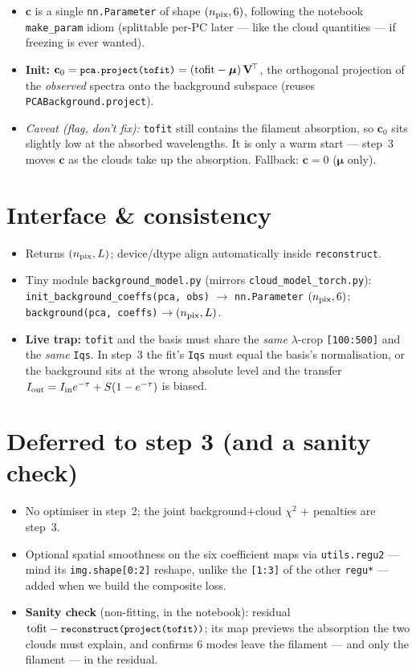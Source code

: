 \documentclass[10pt,a4paper]{article}
\newcommand{\co}[1]{{\small\texttt{#1}}}
\begin{document}
\begin{itemize}
\item $\mathbf c$ is a single \co{nn.Parameter} of shape $(n_{\rm pix},6)$, following the notebook \co{make\_param} idiom (splittable per-PC later --- like the cloud quantities --- if freezing is ever wanted).
\item \textbf{Init:} $\mathbf c_0=\co{pca.project(tofit)}=(\text{tofit}-\boldsymbol\mu)\,\mathbf V^{\!\top}$, the orthogonal projection of the \emph{observed} spectra onto the background subspace (reuses \co{PCABackground.project}).
\item \emph{Caveat (flag, don't fix):} \co{tofit} still contains the filament absorption, so $\mathbf c_0$ sits slightly low at the absorbed wavelengths. It is only a warm start --- step~3 moves $\mathbf c$ as the clouds take up the absorption. Fallback: $\mathbf c=0$ ($\boldsymbol\mu$ only).
\end{itemize}

\section{Interface \& consistency}

\begin{itemize}
\item Returns $(n_{\rm pix},L)$; device/dtype align automatically inside \co{reconstruct}.
\item Tiny module \co{background\_model.py} (mirrors \co{cloud\_model\_torch.py}): \co{init\_background\_coeffs(pca, obs)} $\rightarrow$ \co{nn.Parameter} $(n_{\rm pix},6)$; \co{background(pca, coeffs)} $\rightarrow (n_{\rm pix},L)$.
\item \textbf{Live trap:} \co{tofit} and the basis must share the \emph{same} $\lambda$-crop \co{[100:500]} and the \emph{same} \co{Iqs}. In step~3 the fit's \co{Iqs} must equal the basis's normalisation, or the background sits at the wrong absolute level and the transfer $I_{\rm out}=I_{\rm in}e^{-\tau}+S(1-e^{-\tau})$ is biased.
\end{itemize}

\section{Deferred to step 3 (and a sanity check)}

\begin{itemize}
\item No optimiser in step~2; the joint background+cloud $\chi^2$ + penalties are step~3.
\item Optional spatial smoothness on the six coefficient maps via \co{utils.regu2} --- mind its \co{img.shape[0:2]} reshape, unlike the \co{[1:3]} of the other \co{regu*} --- added when we build the composite loss.
\item \textbf{Sanity check} (non-fitting, in the notebook): residual $\text{tofit}-\co{reconstruct(project(tofit))}$; its map previews the absorption the two clouds must explain, and confirms 6 modes leave the filament --- and only the filament --- in the residual.
\end{itemize}
\end{document}

